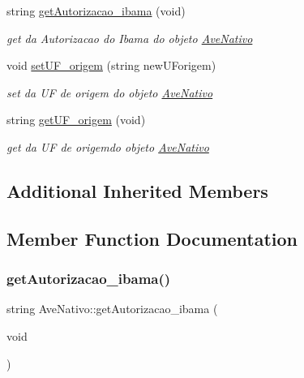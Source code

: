 \begin{DoxyCompactItemize}
string \mbox{\hyperlink{class_ave_nativo_a6d2240c3de84ff7a0b74653e93e715ec}{get\+Autorizacao\+\_\+ibama}} (void)
\begin{DoxyCompactList}\small\item\em get da Autorizacao do Ibama do objeto \mbox{\hyperlink{class_ave_nativo}{Ave\+Nativo}} \end{DoxyCompactList}\item 
void \mbox{\hyperlink{class_ave_nativo_a286361965905e5f01dc36d849031381f}{set\+U\+F\+\_\+origem}} (string new\+U\+Forigem)
\begin{DoxyCompactList}\small\item\em set da UF de origem do objeto \mbox{\hyperlink{class_ave_nativo}{Ave\+Nativo}} \end{DoxyCompactList}\item 
string \mbox{\hyperlink{class_ave_nativo_a063fe391b9e40d61c08e3d8da14aa3d6}{get\+U\+F\+\_\+origem}} (void)
\begin{DoxyCompactList}\small\item\em get da UF de origemdo objeto \mbox{\hyperlink{class_ave_nativo}{Ave\+Nativo}} \end{DoxyCompactList}\end{DoxyCompactItemize}
\subsection*{Additional Inherited Members}


\subsection{Member Function Documentation}
\mbox{\label{class_ave_nativo_a6d2240c3de84ff7a0b74653e93e715ec}} 
\subsubsection{\texorpdfstring{getAutorizacao\_ibama()}{getAutorizacao\_ibama()}}
{\footnotesize\ttfamily string Ave\+Nativo\+::get\+Autorizacao\+\_\+ibama (\begin{DoxyParamCaption}\item[{void}]{ }\end{DoxyParamCaption})\hspace{0.3cm}{\ttfamily [virtual]}}



